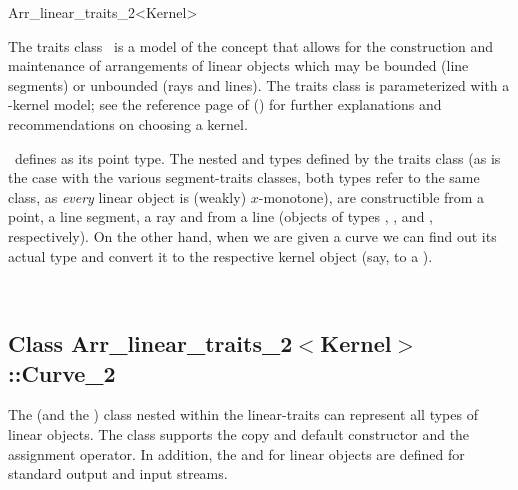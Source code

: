 
\ccRefPageBegin

\begin{ccRefClass}{Arr_linear_traits_2<Kernel>}
    
\ccDefinition 

The traits class \ccRefName\ is a model of the 
concept that allows for the construction and maintenance of arrangements of
linear objects which may be bounded (line segments) or unbounded (rays
and lines). The traits class is parameterized with a \cgal-kernel model;
see the reference page of 
() for further explanations
and recommendations on choosing a kernel.

\ccRefName\ defines  as its point type. The nested
 and  types defined by the traits class
(as is the case with the various segment-traits classes, both types
refer to the same class, as {\sl every} linear object is (weakly) $x$-monotone),
are constructible from a point, a line segment, a ray and from a line
(objects of types , ,
 and , respectively). On the other
hand, when we are given a curve we can find out its actual type and convert
it to the respective kernel object (say, to a ).

 
\ccIsModel
     \\

\subsection*{Class 
        Arr\_linear\_traits\_2$<$Kernel$>$::Curve\_2}

The  (and the ) class nested within
the linear-traits can represent all types of linear objects. The class
supports the copy and default constructor and the assignment operator.
In addition, the  and  for linear objects
are defined for standard output and input streams.


\end{ccRefClass}
